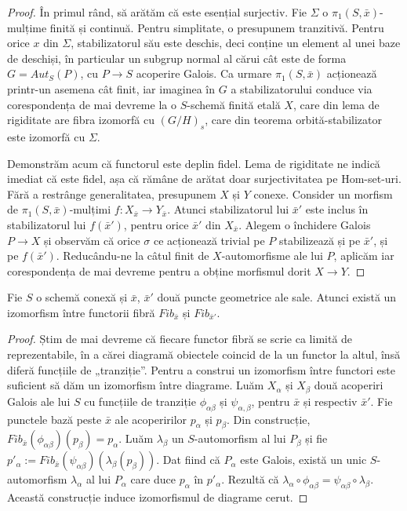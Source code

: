 \documentclass[13pt,openany]{book}
\begin{document}
\begin{proof}
În primul rând, să arătăm că este esențial surjectiv. Fie $\Sigma$ o $\pi_1(S,\bar{x})$-mulțime finită și continuă. Pentru simplitate, o presupunem tranzitivă. Pentru orice $x$ din $\Sigma$, stabilizatorul său este deschis, deci conține un element al unei baze de deschiși, în particular un subgrup normal al cărui cât este de forma $G=Aut_S(P)$, cu $P \rightarrow S$ acoperire Galois. Ca urmare $\pi_1(S,\bar{x})$ acționează printr-un asemena cât finit, iar imaginea în $G$ a stabilizatorului conduce via corespondența de mai devreme la o $S$-schemă finită etală $X$, care din lema de rigiditate are fibra izomorfă cu $(G/H)_s$, care din teorema orbită-stabilizator este izomorfă cu $\Sigma$.

Demonstrăm acum că functorul este deplin fidel. Lema de rigiditate ne indică imediat că este fidel, așa că rămâne de arătat doar surjectivitatea pe Hom-set-uri. Fără a restrânge generalitatea, presupunem $X$ și $Y$ conexe. Consider un morfism de $\pi_1(S,\bar{x})$-mulțimi $f:X_{\bar{x}} \rightarrow Y_{\bar{x}}$. Atunci stabilizatorul lui $\bar{x}'$ este inclus în stabilizatorul lui $f(\bar{x}')$, pentru orice $\bar{x}'$ din $X_{\bar{x}}$. Alegem o închidere Galois $P \rightarrow X$ și observăm că orice $\sigma$ ce acționează trivial pe $P$ stabilizează și pe $\bar{x}'$, și pe $f(\bar{x}')$. Reducându-ne la câtul finit de $X$-automorfisme ale lui $P$, aplicăm iar corespondența de mai devreme pentru a obține morfismul dorit $X \rightarrow Y$.
\end{proof}

\begin{prop}
Fie $S$ o schemă conexă și $\bar{x}$, $\bar{x}'$ două puncte geometrice ale sale. Atunci există un izomorfism între functorii fibră $Fib_{\bar{x}}$ și $Fib_{\bar{x}'}$.
\end{prop}

\begin{proof}
Știm de mai devreme că fiecare functor fibră se scrie ca limită de reprezentabile, în a cărei diagramă obiectele coincid de la un functor la altul, însă diferă funcțiile de „tranziție”. Pentru a construi un izomorfism între functori este suficient să dăm un izomorfism între diagrame. Luăm $X_\alpha$ și $X_\beta$ două acoperiri Galois ale lui $S$ cu funcțiile de tranziție $\phi_{\alpha\beta}$ și $\psi_{\alpha,\beta}$, pentru $\bar{x}$ și respectiv $\bar{x}'$. Fie punctele bază peste $\bar{x}$ ale acoperirilor $p_\alpha$ și $p_\beta$. Din construcție, $Fib_{\bar{x}}(\phi_{\alpha\beta})(p_\beta)=p_\alpha$. Luăm $\lambda_\beta$ un $S$-automorfism al lui $P_\beta$ și fie $p'_\alpha:=Fib_{\bar{x}}(\psi_{\alpha\beta})(\lambda_\beta(p_\beta))$. Dat fiind că $P_\alpha$ este Galois, există un unic $S$-automorfism $\lambda_\alpha$ al lui $P_\alpha$ care duce $p_\alpha$ în $p'_\alpha$. Rezultă că $\lambda_\alpha \circ \phi_{\alpha\beta} = \psi_{\alpha\beta} \circ \lambda_\beta$. Această construcție induce izomorfismul de diagrame cerut.
\end{proof}
\end{document}
